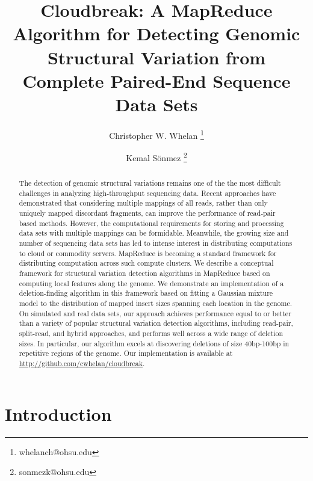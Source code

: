 \documentclass[11pt]{article}
\begin{document}
\title{Cloudbreak: A MapReduce Algorithm for Detecting Genomic Structural Variation from Complete Paired-End Sequence Data Sets}

\author[1,2,4]{Christopher W. Whelan \thanks{whelanch@ohsu.edu}}
\author[1,2,3,4]{Kemal S\"onmez \thanks{sonmezk@ohsu.edu}}


\maketitle

\begin{abstract}
The detection of genomic structural variations remains one of the the most difficult challenges in analyzing high-throughput sequencing data. Recent approaches have demonstrated that considering multiple mappings of all reads, rather than only uniquely mapped discordant fragments, can improve the performance of read-pair based methods. However, the computational requirements for storing and processing data sets with multiple mappings can be formidable. Meanwhile, the growing size and number of sequencing data sets has led to intense interest in distributing computations to cloud or commodity servers. MapReduce is becoming a standard framework for distributing computation across such compute clusters. We describe a conceptual framework for structural variation detection algorithms in MapReduce based on computing local features along the genome. We demonstrate an implementation of a deletion-finding algorithm in this framework based on fitting a Gaussian mixture model to the distribution of mapped insert sizes spanning each location in the genome. On simulated and real data sets, our approach achieves performance equal to or better than a variety of popular structural variation detection algorithms, including read-pair, split-read, and hybrid approaches, and performs well across a wide range of deletion sizes. In particular, our algorithm excels at discovering deletions of size 40bp-100bp in repetitive regions of the genome. Our implementation is available at \url{http://github.com/cwhelan/cloudbreak}.
\end{abstract}

\newpage

\section{Introduction}
\end{document}
